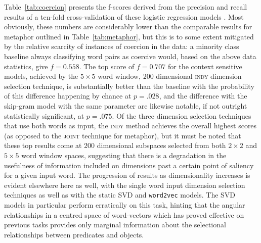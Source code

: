 Table~\ref{tab:coercion} presents the f-scores derived from the precision and recall results of a ten-fold cross-validation of these logistic regression models .  Most obviously, these numbers are considerably lower than the comparable results for metaphor outlined in Table~\ref{tab:metaphor}, but this is to some extent mitigated by the relative scarcity of instances of coercion in the data: a minority class baseline always classifying word pairs as coercive would, based on the above data statistics, give $f = 0.558$.  The top score of $f = 0.707$ for the context sensitive models, achieved by the $5 \times 5$ word window, 200 dimensional \textsc{indy} dimension selection technique, is substantially better than the baseline with the probability of this difference happening by chance at $p = .028$, and the difference with the skip-gram model with the same parameter are likewise notable, if not outright statistically significant, at $p = .075$.  Of the three dimension selection techniques that use both words as input, the \textsc{indy} method achieves the overall highest scores (as opposed to the \textsc{joint} technique for metaphor), but it must be noted that these top results come at 200 dimensional subspaces selected from both $2 \times 2$ and $5 \times 5$ word window spaces, suggesting that there is a degradation in the usefulness of information included on dimensions past a certain point of saliency for a given input word.  The progression of results as dimensionality increases is evident elsewhere here as well, with the single word input dimension selection techniques as well as with the static SVD and \texttt{word2vec} models.  The SVD models in particular perform erratically on this task, hinting that the angular relationships in a centred space of word-vectors which has proved effective on previous tasks provides only marginal information about the selectional relationships between predicates and objects.

